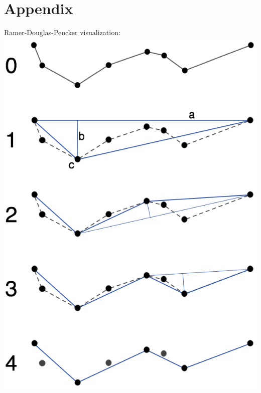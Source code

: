 \documentclass[twoside]{scrartcl}
\begin{document}
\section{Appendix}
Ramer-Douglas-Peucker visualization:\\
\includegraphics[scale=0.6]{rdp.png}
\end{document}
